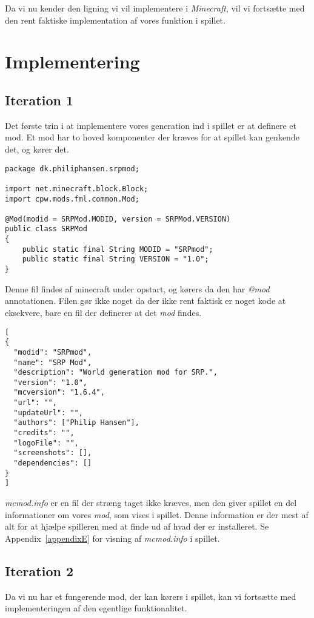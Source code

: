 \documentclass[a4paper,12pt]{report}
\begin{document}
		Da vi nu kender den ligning vi vil implementere i \emph{Minecraft}, vil vi forts\ae tte med den rent faktiske implementation af vores
		funktion i spillet.
	\section{Implementering}
		\subsection{Iteration 1}		
			Det f\o rste trin i at implementere vores generation ind i spillet er at definere et mod.
			Et mod har to hoved komponenter der kræves for at spillet kan genkende det, og k\o rer det.

\begin{lstlisting}[label=srpmod.java,caption=SRPMod.java]
package dk.philiphansen.srpmod;

import net.minecraft.block.Block;
import cpw.mods.fml.common.Mod;

@Mod(modid = SRPMod.MODID, version = SRPMod.VERSION)
public class SRPMod
{
    public static final String MODID = "SRPmod";
    public static final String VERSION = "1.0";
}
\end{lstlisting}
			Denne fil findes af minecraft under opstart, og k\o rers da den har \emph{@mod} annotationen.
			Filen g\o r ikke noget da der ikke rent faktisk er noget kode at eksekvere, bare en fil der definerer at det \emph{mod} findes.

\begin{lstlisting}[label=mcmod.info,caption=mcmod.info]
[
{
  "modid": "SRPmod",
  "name": "SRP Mod",
  "description": "World generation mod for SRP.",
  "version": "1.0",
  "mcversion": "1.6.4",
  "url": "",
  "updateUrl": "",
  "authors": ["Philip Hansen"],
  "credits": "",
  "logoFile": "",
  "screenshots": [],
  "dependencies": []
}
]
\end{lstlisting}
			\emph{mcmod.info} er en fil der str\ae ng taget ikke kr\ae ves, men den giver spillet en del informationer om vores \emph{mod}, som vises i spillet.
			Denne information er der mest af alt for at hj\ae lpe spilleren med at finde ud af hvad der er installeret. Se Appendix~\ref{appendixE} for visning af \emph{mcmod.info} i spillet.
		\subsection{Iteration 2}
			Da vi nu har et fungerende mod, der kan k\o rers i spillet, kan vi forts\ae tte med implementeringen af den egentlige funktionalitet.
\end{document}

